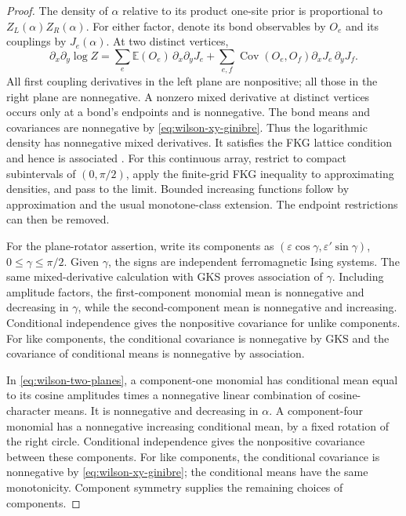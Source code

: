 \begin{proof}
The density of $\alpha$ relative to its product one-site prior is
proportional to $Z_L(\alpha)Z_R(\alpha)$. For either factor, denote
its bond observables by $O_e$ and its couplings by $J_e(\alpha)$.
At two distinct vertices,
\[
 \partial_x\partial_y\log Z
 =\sum_e\mathbb E(O_e)\,\partial_x\partial_yJ_e
 +\sum_{e,f}\operatorname{Cov}(O_e,O_f)
                  \partial_xJ_e\,\partial_yJ_f.
\]
All first coupling derivatives in the left plane are nonpositive;
all those in the right plane are nonnegative. A nonzero mixed
derivative at distinct vertices occurs only at a bond's endpoints
and is nonnegative. The bond means and covariances are nonnegative
by \eqref{eq:wilson-xy-ginibre}. Thus the logarithmic density has
nonnegative mixed derivatives. It satisfies the FKG lattice
condition and hence is associated \cite{FortuinKasteleynGinibre1971}.
For this continuous array, restrict to compact subintervals of
$(0,\pi/2)$, apply the finite-grid FKG inequality to approximating
densities, and pass to the limit. Bounded increasing functions follow
by approximation and the usual monotone-class extension. The endpoint
restrictions can then be removed.

For the plane-rotator assertion, write its components as
$(\varepsilon\cos\gamma,\varepsilon'\sin\gamma)$,
$0\le\gamma\le\pi/2$. Given $\gamma$, the signs are independent
ferromagnetic Ising systems. The same mixed-derivative calculation
with GKS proves association of $\gamma$. Including amplitude factors,
the first-component monomial mean is nonnegative and decreasing in
$\gamma$, while the second-component mean is nonnegative and
increasing. Conditional independence gives the nonpositive covariance
for unlike components. For like components, the conditional covariance
is nonnegative by GKS and the covariance of conditional means is
nonnegative by association.

In \eqref{eq:wilson-two-planes}, a component-one monomial has
conditional mean equal to its cosine amplitudes times a nonnegative
linear combination of cosine-character means. It is nonnegative and
decreasing in $\alpha$. A component-four monomial has a nonnegative
increasing conditional mean, by a fixed rotation of the right circle.
Conditional independence gives the nonpositive covariance between
these components. For like components, the conditional covariance
is nonnegative by \eqref{eq:wilson-xy-ginibre}; the conditional means
have the same monotonicity. Component symmetry supplies the remaining
choices of components.
\end{proof}

